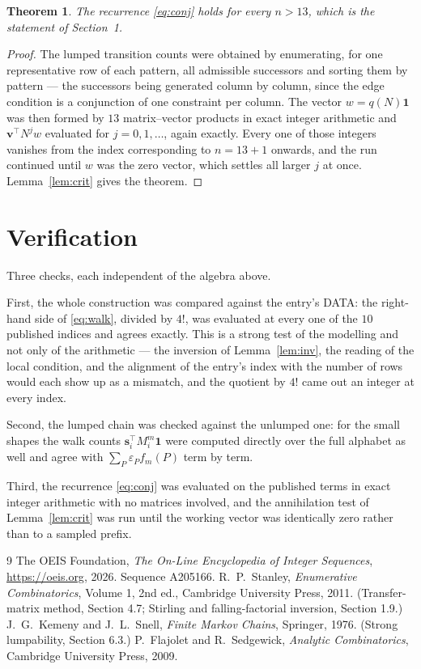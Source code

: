 \documentclass[11pt,a4paper]{article}
\theoremstyle{plain}
\newtheorem{theorem}{Theorem}
\theoremstyle{definition}
\begin{document}
\begin{theorem}
The recurrence \eqref{eq:conj} holds for every $n>13$, which is the statement of
Section~1.
\end{theorem}

\begin{proof}
The lumped transition counts were obtained by enumerating, for one representative row of
each pattern, all admissible successors and sorting them by pattern --- the successors being
generated column by column, since the edge condition is a conjunction of one constraint per
column. The vector $w=q(N)\mathbf{1}$ was then formed by $13$ matrix--vector products
in exact integer arithmetic and $\mathbf{v}^{\!\top}N^{j}w$ evaluated for
$j=0,1,\dots$, again exactly. Every one of those integers vanishes from the index
corresponding to $n=13+1$ onwards, and the run continued until $w$ was the zero vector,
which settles all larger $j$ at once. Lemma~\ref{lem:crit} gives the theorem.
\end{proof}

\section{Verification}

Three checks, each independent of the algebra above.

First, the whole construction was compared against the entry's DATA: the right-hand side of
\eqref{eq:walk}, divided by $4!$, was evaluated at every one of the $10$
published indices and agrees exactly. This is a strong test of the modelling and not only of
the arithmetic --- the inversion of Lemma~\ref{lem:inv}, the reading of the local
condition, and the alignment of the entry's index with the number of rows would each
show up as a mismatch, and the quotient by $4!$ came out an integer at every index.

Second, the lumped chain was checked against the unlumped one: for the small shapes the walk
counts $\mathbf{s}_i^{\!\top}M_i^{m}\mathbf{1}$ were computed directly over the full
alphabet as well and agree with $\sum_P\varepsilon_Pf_m(P)$ term by term.

Third, the recurrence \eqref{eq:conj} was evaluated on the published terms in exact integer
arithmetic with no matrices involved, and the annihilation test of Lemma~\ref{lem:crit} was
run until the working vector was identically zero rather than to a sampled prefix.

\begin{thebibliography}{9}
 The OEIS Foundation, \emph{The On-Line Encyclopedia of Integer
Sequences}, \url{https://oeis.org}, 2026. Sequence A205166.
 R.~P.~Stanley, \emph{Enumerative Combinatorics}, Volume 1, 2nd ed.,
Cambridge University Press, 2011. (Transfer-matrix method, Section 4.7; Stirling and
falling-factorial inversion, Section 1.9.)
 J.~G.~Kemeny and J.~L.~Snell, \emph{Finite Markov Chains}, Springer,
1976. (Strong lumpability, Section 6.3.)
 P.~Flajolet and R.~Sedgewick, \emph{Analytic Combinatorics}, Cambridge
University Press, 2009.
\end{thebibliography}
\end{document}
